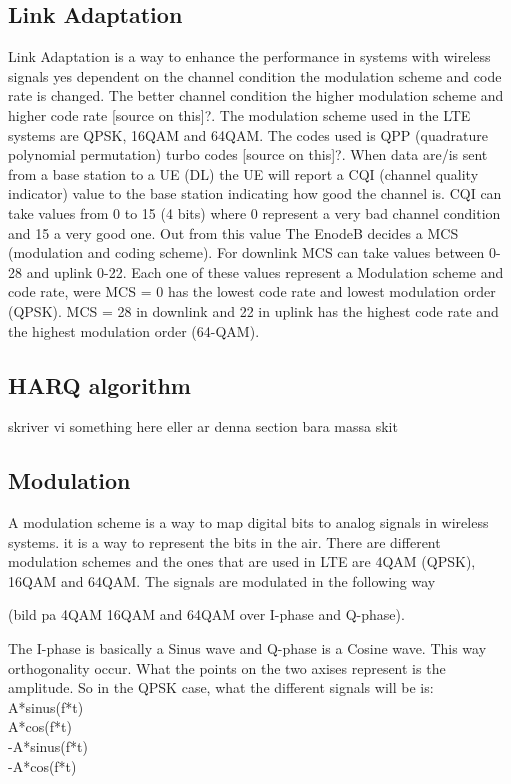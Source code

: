 \documentclass[cropmarks, frame, english]{idamasterthesis}
\begin{document}
\subsection{Link Adaptation}
Link Adaptation is a way to enhance the performance in systems with wireless signals yes dependent on the channel condition the modulation scheme and code rate is changed. The better channel condition the higher modulation scheme and higher code rate [source on this]?. The modulation scheme used in the LTE systems are QPSK, 16QAM and 64QAM. The codes used is QPP (quadrature polynomial permutation) turbo codes [source on this]?. When data are/is sent from a base station to a UE (DL) the UE will report a CQI (channel quality indicator) value to the base station indicating how good the channel is. CQI can take values from 0 to 15 (4 bits) where 0 represent a very bad channel condition and 15 a very good one. Out from this value The EnodeB decides a MCS (modulation and coding scheme). For downlink MCS can take values between 0-28 and uplink 0-22. Each one of these values represent a Modulation scheme and code rate, were MCS = 0 has the lowest code rate and lowest modulation order (QPSK). MCS = 28 in downlink and 22 in uplink has the highest code rate and the highest modulation order (64-QAM).

\subsection{HARQ algorithm}
skriver vi something here eller ar denna section bara massa skit

\subsection{Modulation}
A modulation scheme is a way to map digital bits to analog signals in wireless systems. it is a way to represent the bits in the air.
There are different modulation schemes and the ones that are used in LTE are 4QAM (QPSK), 16QAM and 64QAM. The signals are modulated in the following way 

(bild pa 4QAM 16QAM and 64QAM over I-phase and Q-phase). 
 
The I-phase is basically a Sinus wave and Q-phase is a Cosine wave. This way orthogonality occur. What the points on the two axises represent is the amplitude. So in the QPSK case, what the different signals will be is:\\
 A*sinus(f*t)\\
 A*cos(f*t)\\
 -A*sinus(f*t) \\  
 -A*cos(f*t)\\
 
\end{document}
